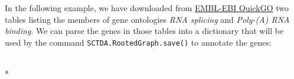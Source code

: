 \documentclass[letterpaper,10pt,english]{/usr/share/sphinx/texinputs/sphinxhowto}
\def\smaller{\fontsize{9.5pt}{9.5pt}\selectfont}
\begin{document}
In the following example, we have downloaded from \href{http://www.ebi.ac.uk/QuickGO/}{EMBL-EBI QuickGO} two tables
listing the members of gene ontologies \emph{RNA splicing} and
\emph{Poly-(A) RNA binding}. We can parse the genes in those tables into
a dictionary that will be used by the command \texttt{SCTDA.RootedGraph.save()}
to annotate the genes:


    
        \vspace{8pt}
        \makebox[0.1\linewidth]{\smaller\hfill\tt\color{nbframe-in-prompt}In\hspace{4pt}{[}30{]}:\hspace{4pt}}\\*
        \vspace{-2.1\baselineskip}
\end{document}
